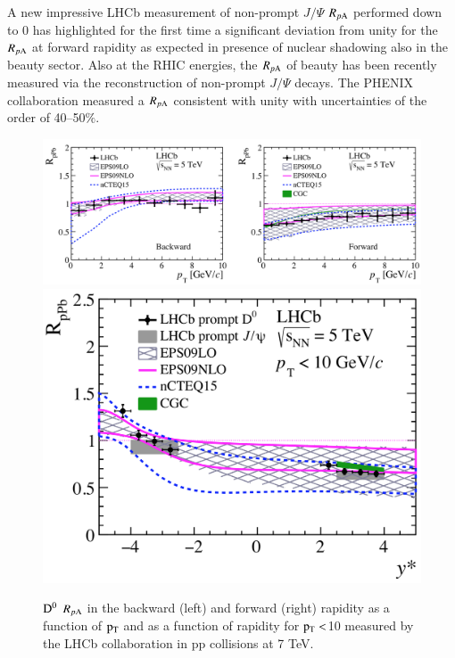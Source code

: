 \documentclass{webofc}
\begin{document}
A new impressive LHCb measurement of non-prompt $J/\Psi$ $R_{p \mathrm{A}}$ performed down to 0 \GeVc has highlighted for the first time a significant deviation from unity for the $R_{p \mathrm{A}}$ at forward rapidity as expected in 
presence of nuclear shadowing also in the beauty sector. Also at the RHIC energies, the $R_{p \mathrm{A}}$ of beauty has been recently measured via the reconstruction of non-prompt $J/\Psi$ decays. 
The PHENIX collaboration measured a $R_{p \mathrm{A}}$ consistent with unity with uncertainties of the order of 40--50$\%$.
\begin{figure}[ht]
\centering
\includegraphics[width=.65\textwidth]{Plots/DRpAvsptLHCb2017}
\includegraphics[width=.32\textwidth]{Plots/DRpALHCb2017}
\caption{$\rm D^{0}$ $R_{p \mathrm{A}}$ in the backward (left) and forward (right) rapidity as a function of $\rm p_{\rm T} $ and as a function of rapidity for $\rm p_{\rm T} <$10 \GeVc measured by the LHCb collaboration in pp collisions at 7 TeV.}
\label{fig:RpA}     
\end{figure}
\end{document}
